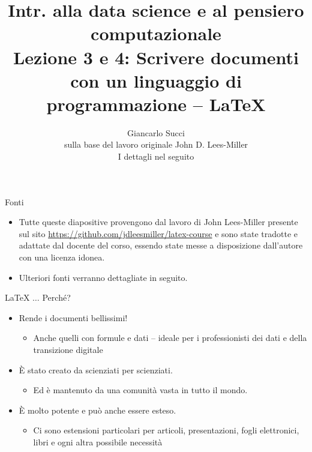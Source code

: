 \documentclass{beamer}
\title[L03.04]{Intr. alla data science e al pensiero computazionale \\ Lezione 3 e 4: Scrivere documenti con un linguaggio di programmazione -- \LaTeX{}} %
\author[{\tiny Giancarlo Succi}]{Giancarlo Succi \\ sulla base del lavoro originale John D. Lees-Miller \\ I dettagli nel seguito} %
\institute[unibo] %
\date{} %
\begin{document}
\begin{frame}
\titlepage %
\end{frame}



\begin{frame}[label={L:Fonti}]
{\centerline{Fonti}}
\begin{itemize}
    \item Tutte queste diapositive provengono dal lavoro di John Lees-Miller presente sul sito \url{https://github.com/jdleesmiller/latex-course} e sono state tradotte e adattate dal docente del corso, essendo state messe a disposizione dall'autore con una licenza idonea. 
    \item Ulteriori fonti verranno dettagliate in seguito.
\end{itemize}
\end{frame}

\begin{frame}
{\centerline{\LaTeX{} $\ldots{}$ Perch\'{e}?}}
\begin{itemize}
\item Rende i documenti bellissimi!
\begin{itemize}
\item Anche quelli con formule e dati -- ideale per i professionisti dei dati e della transizione digitale
\end{itemize}
%
\item \`{E} stato creato da scienziati per scienziati.
\begin{itemize}
\item Ed \`{e} mantenuto da una comunit\`{a} vasta in tutto il mondo.
\end{itemize}
%
\item \`{E} molto potente e pu\`{o} anche essere esteso.
\begin{itemize}
\item Ci sono estensioni particolari per articoli, presentazioni, fogli elettronici, libri e ogni altra possibile necessit\`{a}
\end{itemize}
\end{itemize}
\end{frame}
\end{document}
